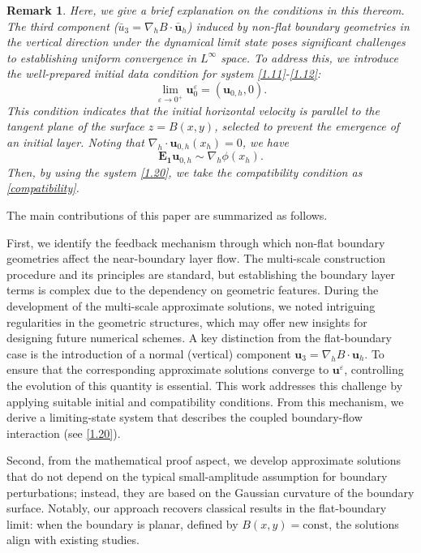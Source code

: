 \documentclass[pdflatex,sn-mathphys-num]{sn-jnl}%
\theoremstyle{thmstyleone}%
\theoremstyle{thmstyletwo}%
\newtheorem{remark}{Remark}%
\theoremstyle{thmstylethree}%
\theoremstyle{thmstyletwo}
\begin{document}
\begin{remark}\label{re4}
	 Here, we give a brief explanation on the conditions in this thereom.
	 The third component ($\bar{u}_3=\nabla_{ h}B\cdot\bar{\boldsymbol{u}}_h$) induced by non-flat boundary geometries in the vertical direction under the dynamical limit state poses significant challenges to establishing uniform convergence in \( L^\infty \) space. To address this, we introduce the well-prepared initial data condition for system \eqref{1.11}-\eqref{1.12}:
	$$
	\mathop{\lim}\limits_{\varepsilon\rightarrow 0^+} \boldsymbol u^\varepsilon_0=
	 ({\boldsymbol u}_{0,h}, 0).
	$$
This condition indicates that the initial horizontal velocity is parallel to the tangent plane of the surface \( z = B(x,y) \), selected to prevent the emergence of an initial layer. Noting that \( \nabla_h \cdot \boldsymbol{u}_{0,h}(x_h) = 0 \), we have
\begin{equation}\label{compatibility1}
		\boldsymbol{E_1}\boldsymbol{u}_{0,h}\sim\nabla_{h}\phi(x_h).
	\end{equation}
	Then, by using the system \eqref{1.20}, we take the compatibility condition as \eqref{compatibility}.
\end{remark}




The main contributions of this paper are summarized as follows.

First, we identify the feedback mechanism through which non-flat boundary geometries affect the near-boundary layer flow.
    The multi-scale construction procedure and its principles are standard, but establishing the  boundary layer terms is complex due to the dependency on geometric features. During the development of the multi-scale approximate solutions, we noted intriguing regularities in the geometric structures, which may offer new insights for designing future numerical schemes. A key distinction from the flat-boundary case is the introduction of a normal (vertical) component \(\boldsymbol{u}_3=\nabla_h B\cdot \boldsymbol{u}_h\). To ensure that the corresponding approximate solutions converge to \(\boldsymbol{u}^\varepsilon \), controlling  the evolution of this quantity is essential. This work addresses this challenge by applying suitable initial and compatibility conditions.  From this mechanism, we derive a limiting-state system  that describes the coupled boundary-flow interaction (see \eqref{1.20}). 
    
Second, from the mathematical proof aspect, we develop approximate solutions that do not depend on the typical small-amplitude assumption for boundary perturbations; instead, they are based on the Gaussian curvature of the boundary surface. Notably, our approach recovers classical results in the flat-boundary limit: when the boundary is planar, defined by \(B(x,y)=\text{const}\), the solutions align with existing studies.
\end{document}
